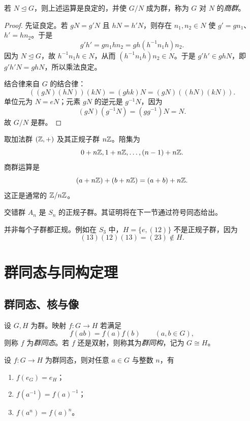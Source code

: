 \begin{proposition}
若 $N\trianglelefteq G$，则上述运算是良定的，并使 $G/N$ 成为群，称为 $G$ 对 $N$ 的\emph{商群}。
\end{proposition}

\begin{proof}
先证良定。若 $gN=g'N$ 且 $hN=h'N$，则存在 $n_1,n_2\in N$ 使 $g'=gn_1$、$h'=hn_2$。于是
\[
 g'h'=gn_1hn_2=gh(h^{-1}n_1h)n_2.
\]
因为 $N\trianglelefteq G$，故 $h^{-1}n_1h\in N$，从而 $(h^{-1}n_1h)n_2\in N$。于是 $g'h'\in ghN$，即 $g'h'N=ghN$，所以乘法良定。

结合律来自 $G$ 的结合律：
\[
 ((gN)(hN))(kN)=(ghk)N=(gN)((hN)(kN)).
\]
单位元为 $N=eN$；元素 $gN$ 的逆元是 $g^{-1}N$，因为
\[
 (gN)(g^{-1}N)=(gg^{-1})N=N.
\]
故 $G/N$ 是群。
\end{proof}

\begin{example}
取加法群 $(\mathbb{Z},+)$ 及其正规子群 $n\mathbb{Z}$。陪集为
\[
 0+n\mathbb{Z},1+n\mathbb{Z},\dots,(n-1)+n\mathbb{Z}.
\]
商群运算是
\[
 (a+n\mathbb{Z})+(b+n\mathbb{Z})=(a+b)+n\mathbb{Z}.
\]
这正是通常的 $\mathbb{Z}/n\mathbb{Z}$。
\end{example}

\begin{example}
交错群 $A_n$ 是 $S_n$ 的正规子群。其证明将在下一节通过符号同态给出。
\end{example}

\begin{remark}
并非每个子群都正规。例如在 $S_3$ 中，$H=\{e,(12)\}$ 不是正规子群，因为
\[
 (13)(12)(13)=(23) \notin H.
\]
\end{remark}

\section{群同态与同构定理}

\subsection*{群同态、核与像}

\begin{definition}
设 $G,H$ 为群。映射 $f:G\to H$ 若满足
\[
 f(ab)=f(a)f(b) \qquad (a,b\in G),
\]
则称 $f$ 为\emph{群同态}。若 $f$ 还是双射，则称其为\emph{群同构}，记为 $G\cong H$。
\end{definition}

\begin{proposition}
设 $f:G\to H$ 为群同态，则对任意 $a\in G$ 与整数 $n$，有
\begin{enumerate}[label=\textnormal{(\arabic*)}, leftmargin=3em]
  \item $f(e_G)=e_H$；
  \item $f(a^{-1})=f(a)^{-1}$；
  \item $f(a^n)=f(a)^n$。
\end{enumerate}
\end{proposition}

